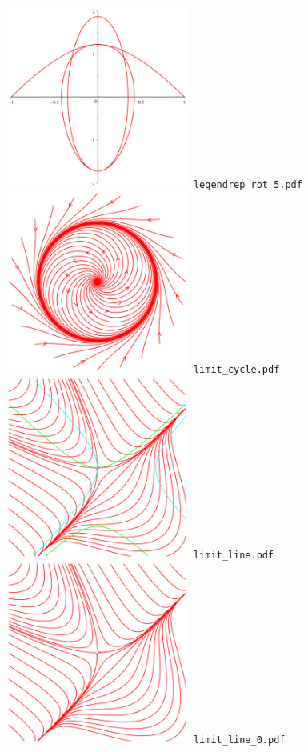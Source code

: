 \documentclass[a4paper]{amsart}
\begin{document}
\includegraphics[width=6cm]{legendrep_rot_5.pdf}\verb+ legendrep_rot_5.pdf+\\
\includegraphics[width=6cm]{limit_cycle.pdf}\verb+ limit_cycle.pdf+\\
\includegraphics[width=6cm]{limit_line.pdf}\verb+ limit_line.pdf+\\
\includegraphics[width=6cm]{limit_line_0.pdf}\verb+ limit_line_0.pdf+\\
\end{document}
